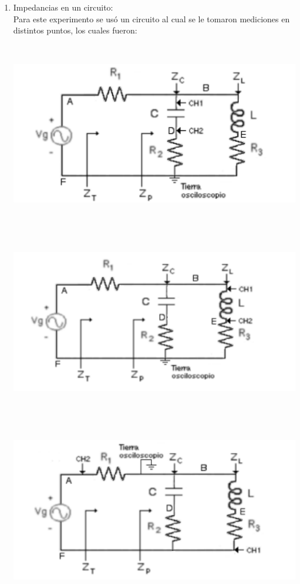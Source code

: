 \documentclass[12pt]{article}
\begin{document}
\begin{enumerate}
		\item Impedancias en un circuito:\\
		
		Para este experimento se usó un circuito al cual se le tomaron mediciones en distintos puntos, los cuales fueron:\\
		
		\begin{center}
			\includegraphics[width=16cm,height=8cm]{Img/circ_4}
		\end{center}
	
		\begin{center}
			\includegraphics[width=16cm,height=8cm]{Img/circ_5}
		\end{center}
		
		\begin{center}
			\includegraphics[width=16cm,height=8cm]{Img/circ_6}
		\end{center}
	

\end{enumerate}
\end{document}
